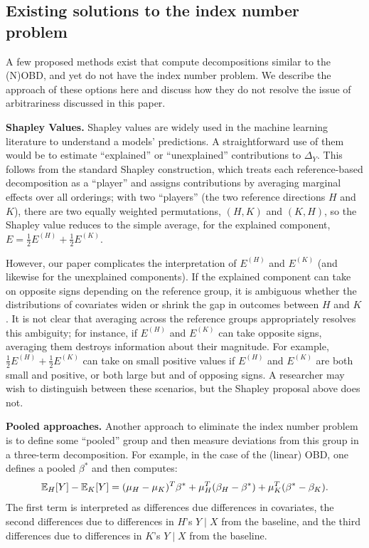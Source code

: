 \subsection{Existing solutions to the index number problem}
\label{sec:existing_index_number}
A few proposed methods exist that compute decompositions similar to the (N)OBD, and yet do not have the index number problem.
We describe the approach of these options here and discuss how they do not resolve the issue of arbitrariness discussed in this paper.

\textbf{Shapley Values.} Shapley values \citep{Shapley1953} are widely used in the machine learning literature to understand a models' predictions.
A straightforward use of them would be to estimate ``explained'' or ``unexplained'' contributions to $\Delta_Y$.
This follows from the standard Shapley construction, which treats each reference-based decomposition as a ``player'' and assigns contributions by averaging marginal effects over all orderings; with two ``players'' (the two reference directions $H$ and $K$), there are two equally weighted permutations, $(H,K)$ and $(K,H)$, so the Shapley value reduces to the simple average, for the explained component, $E = \tfrac{1}{2}E^{(H)} + \tfrac{1}{2}E^{(K)}$.

However, our paper complicates the interpretation of $E^{(H)}$ and $E^{(K)}$ (and likewise for the unexplained components). 
If the explained component can take on opposite signs depending on the reference group, it is ambiguous whether the distributions of covariates widen or shrink the gap in outcomes between $H$ and $K$.
It is not clear that averaging across the reference groups appropriately resolves this ambiguity; for instance, if $E^{(H)}$ and $E^{(K)}$ can take opposite signs, averaging them destroys information about their magnitude.
For example, $\tfrac{1}{2}E^{(H)} + \tfrac{1}{2}E^{(K)}$ can take on small positive values if $E^{(H)}$ and $E^{(K)}$ are both small and positive, or both large but and of opposing signs. 
A researcher may wish to distinguish between these scenarios, but the Shapley proposal above does not.

\textbf{Pooled approaches.}
Another approach to eliminate the index number problem is to define some ``pooled'' group and then measure deviations from this group in a three-term decomposition. For example, in the case of the (linear) OBD, one defines a pooled $\beta^*$ and then computes:
\begin{equation}
  \mathbb{E}_H[Y] - \mathbb{E}_K[Y] = (\mu_H - \mu_K)^T \beta^* + \mu_H^T (\beta_H - \beta^*) + \mu_K^T(\beta^* - \beta_K).
\end{equation}
The first term is interpreted as differences due differences in covariates, the second differences due to differences in $H$'s $Y \mid X$ from the baseline, and the third differences due to differences in $K$'s $Y \mid X$ from the baseline.

